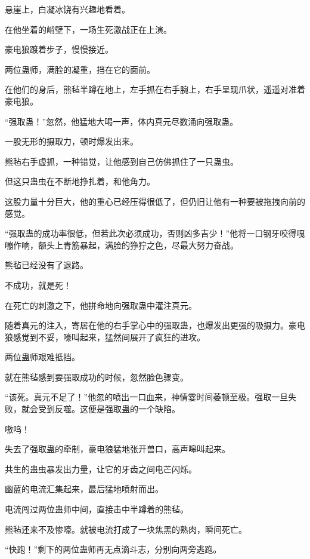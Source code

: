 
\begin{this_body}



悬崖上，白凝冰饶有兴趣地看着。

在他坐着的峭壁下，一场生死激战正在上演。

豪电狼踱着步子，慢慢接近。

两位蛊师，满脸的凝重，挡在它的面前。

在他们的身后，熊毡半蹲在地上，左手抓在右手腕上，右手呈现爪状，遥遥对准着豪电狼。

“强取蛊！”忽然，他猛地大喝一声，体内真元尽数涌向强取蛊。

一股无形的摄取力，顿时爆发出来。

熊毡右手虚抓，一种错觉，让他感到自己仿佛抓住了一只蛊虫。

但这只蛊虫在不断地挣扎着，和他角力。

这股力量十分巨大，他的重心已经压得很低了，但仍旧让他有一种要被拖拽向前的感觉。

“强取蛊的成功率很低，但若此次必须成功，否则凶多吉少！”他将一口钢牙咬得嘎嘣作响，额头上青筋暴起，满脸的狰狞之色，尽最大努力奋战。

熊毡已经没有了退路。

不成功，就是死！

在死亡的刺激之下，他拼命地向强取蛊中灌注真元。

随着真元的注入，寄居在他的右手掌心中的强取蛊，也爆发出更强的吸摄力。豪电狼感觉到不妥，嚎叫起来，猛然间展开了疯狂的进攻。

两位蛊师艰难抵挡。

就在熊毡感到要强取成功的时候，忽然脸色骤变。

“该死。真元不足了！”他忽的喷出一口血来，神情霎时间萎顿至极。强取一旦失败，就会受到反噬。这便是强取蛊的一个缺陷。

嗷呜！

失去了强取蛊的牵制，豪电狼猛地张开兽口，高声嗥叫起来。

共生的蛊虫暴发出力量，让它的牙齿之间电芒闪烁。

幽蓝的电流汇集起来，最后猛地喷射而出。

电流闯过两位蛊师中间，直接击中半蹲着的熊毡。

熊毡还来不及惨嚎。就被电流打成了一块焦黑的熟肉，瞬间死亡。

“快跑！”剩下的两位蛊师再无点滴斗志，分别向两旁逃跑。


\end{this_body}
